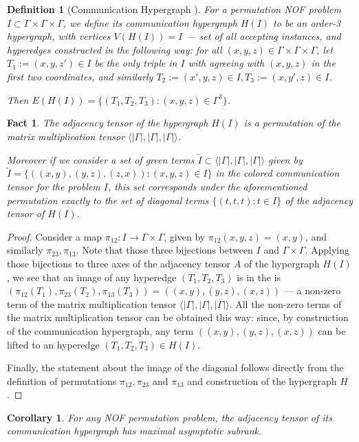 \documentclass[10pt,a4paper]{article}
\newtheorem{definition}[theorem]{Definition}
\newtheorem{fact}[theorem]{Fact}
\newtheorem{corollary}[theorem]{Corollary}
\newcommand{\inprod}[1]{\langle #1 \rangle}
\begin{document}
\begin{definition}[Communication Hypergraph \cite{CFL83}]
\label{def:communication-hypergraph}
For a permutation NOF problem $I \subset \Gamma \times \Gamma \times \Gamma$, we define its communication hypergraph $H(I)$ to be an order-3 hypergraph, with vertices $V(H(I)) = I$ --- set of all accepting instances, and hyperedges constructed in the following way: for all $(x,y,z) \in \Gamma \times \Gamma \times \Gamma$, let $T_1 := (x, y, z') \in I$ be the only triple in $I$ with agreeing with $(x,y,z)$ in the first two coordinates, and similarly $T_2 := (x',y,z) \in I, T_3 := (x, y', z) \in I$.

Then $E(H(I)) = \{ (T_1, T_2, T_3) : (x,y,z) \in \Gamma^3 \}$.
\end{definition}

\begin{fact}
The adjacency tensor of the hypergraph $H(I)$ is a permutation of the matrix multiplication tensor $\inprod{|\Gamma|, |\Gamma|, |\Gamma|}$. 

Moreover if we consider a set of green terms $\tilde{I} \subset \inprod{|\Gamma|, |\Gamma|, |\Gamma|}$ given by $\tilde{I} = \{((x,y), (y,z), (z,x)) : (x,y,z) \in I\}$ in the colored communication tensor for the problem $I$, this set 
 corresponds under the aforementioned permutation exactly to the set of diagonal terms $\{(t,t,t) : t \in I\}$ of the adjacency tensor of $H(I)$.
\end{fact}
\begin{proof}
Consider a map $\pi_{12} : I \to \Gamma \times \Gamma$, given by $\pi_{12}(x,y,z) = (x,y)$, and similarly $\pi_{23}, \pi_{13}$. Note that those three bijections between $I$ and $\Gamma \times \Gamma$. Applying those bijections to three axes of the adjacency tensor $A$ of the hypergraph $H(I)$, we see that an image of any hyperedge $(T_1, T_2, T_3)$ is in the  is $(\pi_{12}(T_1), \pi_{23}(T_2), \pi_{13}(T_3)) = ( (x,y), (y,z), (x,z) )$ --- a non-zero term of the matrix multiplication tensor $\inprod{|\Gamma|, |\Gamma|, |\Gamma|}$. All the non-zero terms of the matrix multiplication tensor can be obtained this way: since, by construction of the communication hypergraph, any term $( (x,y), (y,z), (x,z))$ can be lifted to an hyperedge $(T_1, T_2, T_3) \in H(I).$

Finally, the statement about the image of the diagonal follows directly from the definition of permutations $\pi_{12}, \pi_{23}$ and $\pi_{13}$ and construction of the hypergraph $H$.
\end{proof}
\begin{corollary}
    For any NOF permutation problem, the adjacency tensor of its communication hypergraph has maximal asymptotic subrank.
\end{corollary}
\end{document}
